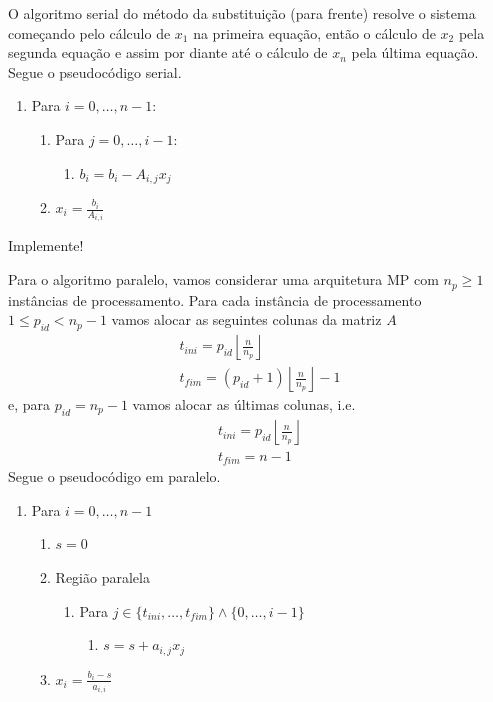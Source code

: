 O algoritmo serial do método da substituição (para frente) resolve o sistema começando pelo cálculo de $x_1$ na primeira equação, então o cálculo de $x_2$ pela segunda equação e assim por diante até o cálculo de $x_n$ pela última equação. Segue o pseudocódigo serial.
\begin{enumerate}
\item Para $i = 0, \dotsc, n-1$:
  \begin{enumerate}
  \item Para $j = 0, \dotsc, i-1$:
    \begin{enumerate}
    \item $b_i = b_i - A_{i,j}x_j$
    \end{enumerate}
  \item $\displaystyle x_i = \frac{b_i}{A_{i,i}}$
  \end{enumerate}
\end{enumerate}
Implemente!

Para o algoritmo paralelo, vamos considerar uma arquitetura MP com $n_p \geq 1$ instâncias de processamento. Para cada instância de processamento $1 \leq p_{id} < n_p-1$ vamos alocar as seguintes colunas da matriz $A$
\begin{gather}
  t_{ini} = p_{id}\left\lfloor\frac{n}{n_p}\right\rfloor\\
  t_{fim} = (p_{id}+1)\left\lfloor\frac{n}{n_p}\right\rfloor-1 
\end{gather}
e, para $p_{id}=n_{p}-1$ vamos alocar as últimas colunas, i.e.
\begin{gather}
  t_{ini} = p_{id}\left\lfloor\frac{n}{n_p}\right\rfloor\\
  t_{fim} = n-1
\end{gather}
Segue o pseudocódigo em paralelo.
\begin{enumerate}
\item Para $i = 0,\dotsc,n-1$
  \begin{enumerate}
  \item $s = 0$
  \item Região paralela
    \begin{enumerate}
    \item Para $j\in\{t_{ini},\dotsc,t_{fim}\}\land\{0,\dotsc,i-1\}$
      \begin{enumerate}
      \item $s = s + a_{i,j}x_{j}$
      \end{enumerate}
    \end{enumerate}
  \item $\displaystyle x_i = \frac{b_i - s}{a_{i,i}}$
  \end{enumerate}
\end{enumerate}

